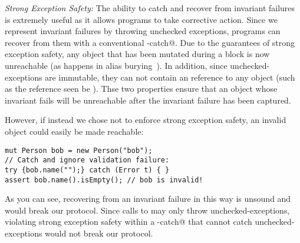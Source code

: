 %
%

\loseSpace
\noindent\textit{Strong Exception Safety:}
The ability to catch and recover from invariant failures is extremely useful as it allows programs to take corrective action.
Since we represent invariant failures by throwing unchecked exceptions, programs can recover from them with a conventional \Q@try-catch@.
	Due to the guarantees of strong exception safety, any object that has been mutated during a \Q@try@ block is now unreachable (as happens in alias burying~\cite{boyland2001alias}). In addition, since unchecked-exceptions are immutable, they can not contain an \Q@read@ reference to any object (such as the \Q@this@ reference seen be \Q@invariant@). Thse two properties ensure that an object whose invariant fails will be unreachable after the invariant failure has been captured. %

However, if instead we chose not to enforce strong exception safety, an invalid object could easily be made reachable:
\saveSpace
\begin{lstlisting}[morekeywords={assert}, escapechar=\%]
mut Person bob = new Person("bob");
// Catch and ignore validation failure:
try {bob.name("");} catch (Error t) { }
assert bob.name().isEmpty(); // bob is invalid!
\end{lstlisting}
\saveSpace
As you can see, recovering from an invariant failure in this way is unsound and would break our protocol.
Since calls to \validate{} may only throw unchecked-exceptions, violating strong exception safety within a \Q@try-catch@ that cannot catch unchecked-exceptions would not break our protocol.

